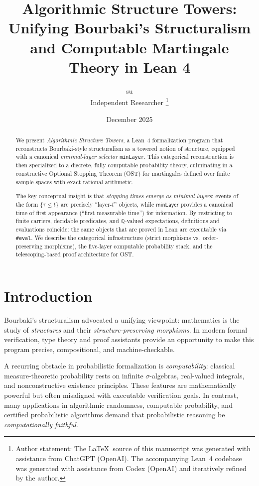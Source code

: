 \documentclass[11pt]{article}
\title{\bfseries Algorithmic Structure Towers:\\Unifying Bourbaki's Structuralism and Computable Martingale Theory in Lean 4}
\author{
  su\\
  \small Independent Researcher
  \thanks{Author statement: The \LaTeX\ source of this manuscript was generated with assistance from ChatGPT (OpenAI). The accompanying Lean~4 codebase was generated with assistance from Codex (OpenAI) and iteratively refined by the author.}
}
\date{December 2025}
\newcommand{\QQ}{\mathbb{Q}}
\newcommand{\minLayer}{\mathsf{minLayer}}
\begin{document}
\maketitle

\begin{abstract}
We present \emph{Algorithmic Structure Towers}, a Lean~4 formalization program that reconstructs Bourbaki-style structuralism as a towered notion of structure, equipped with a canonical \emph{minimal-layer selector} \texttt{minLayer}. This categorical reconstruction is then specialized to a discrete, fully computable probability theory, culminating in a constructive Optional Stopping Theorem (OST) for martingales defined over finite sample spaces with exact rational arithmetic.

The key conceptual insight is that \emph{stopping times emerge as minimal layers}: events of the form $\{\tau \le t\}$ are precisely ``layer-$t$'' objects, while $\minLayer$ provides a canonical time of first appearance (``first measurable time'') for information. By restricting to finite carriers, decidable predicates, and $\QQ$-valued expectations, definitions and evaluations coincide: the same objects that are proved in Lean are executable via \texttt{\#eval}. We describe the categorical infrastructure (strict morphisms vs.\ order-preserving morphisms), the five-layer computable probability stack, and the telescoping-based proof architecture for OST.
\end{abstract}

\section{Introduction}
Bourbaki's structuralism advocated a unifying viewpoint: mathematics is the study of \emph{structures} and their \emph{structure-preserving morphisms}. In modern formal verification, type theory and proof assistants provide an opportunity to make this program precise, compositional, and machine-checkable.

A recurring obstacle in probabilistic formalization is \emph{computability}: classical measure-theoretic probability rests on infinite $\sigma$-algebras, real-valued integrals, and nonconstructive existence principles. These features are mathematically powerful but often misaligned with executable verification goals. In contrast, many applications in algorithmic randomness, computable probability, and certified probabilistic algorithms demand that probabilistic reasoning be \emph{computationally faithful}.
\end{document}

